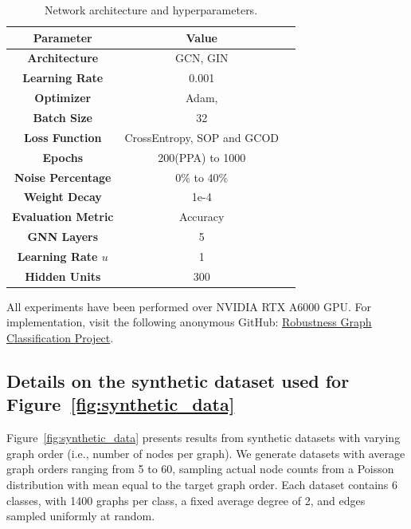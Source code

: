 {\begin{table}[h!]
\centering
\begin{tabular}{|c|c|c|}
\hline
\textbf{Parameter}        & \textbf{Value}                                    \\ \hline
\textbf{Architecture}     & GCN, GIN                                     \\ \hline
\textbf{Learning Rate}    & 0.001                                     \\ \hline
\textbf{Optimizer}        & Adam,                                    \\ \hline
\textbf{Batch Size}       & 32                                               \\ \hline
\textbf{Loss Function}    & CrossEntropy, SOP and GCOD                 \\ \hline
\textbf{Epochs}           & 200(PPA) to 1000                                              \\ \hline
\textbf{Noise Percentage} & 0\% to 40\%                   \\ \hline
\textbf{Weight Decay}     & 1e-4                       \\ \hline
\textbf{Evaluation Metric} & Accuracy                \\ \hline
\textbf{GNN Layers } & 5                \\ \hline
\textbf{Learning Rate $u$ } & 1               \\ \hline
\textbf{Hidden Units } & 300             \\ \hline
\end{tabular}
\caption{Network architecture and hyperparameters.}
\end{table}

All experiments have been performed over NVIDIA RTX A6000 GPU. For implementation, visit the following anonymous GitHub: 
\href{https://anonymous.4open.science/r/Robustness_Graph_Classification-E76F}{Robustness Graph Classification Project}.

\subsection{Details on the synthetic dataset used for Figure~\ref{fig:synthetic_data} } \label{appendix:details_synthetic_dataset_varying_nodes}
Figure~\ref{fig:synthetic_data} presents results from synthetic datasets with varying graph order (i.e., number of nodes per graph). We generate datasets with average graph orders ranging from 5 to 60, sampling actual node counts from a Poisson distribution with mean equal to the target graph order. Each dataset contains 6 classes, with 1400 graphs per class, a fixed average degree of 2, and edges sampled uniformly at random.

}
